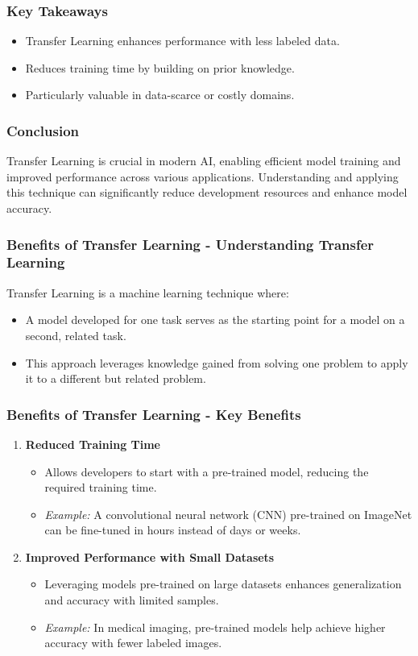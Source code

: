 \documentclass[aspectratio=169]{beamer}
\begin{document}
\begin{frame}[fragile]
    \frametitle{Key Takeaways}
    \begin{itemize}
        \item Transfer Learning enhances performance with less labeled data.
        \item Reduces training time by building on prior knowledge.
        \item Particularly valuable in data-scarce or costly domains.
    \end{itemize}
\end{frame}

\begin{frame}[fragile]
    \frametitle{Conclusion}
    Transfer Learning is crucial in modern AI, enabling efficient model training and improved performance across various applications. Understanding and applying this technique can significantly reduce development resources and enhance model accuracy.
\end{frame}

\begin{frame}[fragile]
    \frametitle{Benefits of Transfer Learning - Understanding Transfer Learning}
    Transfer Learning is a machine learning technique where:
    \begin{itemize}
        \item A model developed for one task serves as the starting point for a model on a second, related task.
        \item This approach leverages knowledge gained from solving one problem to apply it to a different but related problem.
    \end{itemize}
\end{frame}

\begin{frame}[fragile]
    \frametitle{Benefits of Transfer Learning - Key Benefits}
    \begin{enumerate}
        \item \textbf{Reduced Training Time}
            \begin{itemize}
                \item Allows developers to start with a pre-trained model, reducing the required training time.
                \item \textit{Example:} A convolutional neural network (CNN) pre-trained on ImageNet can be fine-tuned in hours instead of days or weeks.
            \end{itemize}

        \item \textbf{Improved Performance with Small Datasets}
            \begin{itemize}
                \item Leveraging models pre-trained on large datasets enhances generalization and accuracy with limited samples.
                \item \textit{Example:} In medical imaging, pre-trained models help achieve higher accuracy with fewer labeled images.
            \end{itemize}
    \end{enumerate}
\end{frame}
\end{document}
